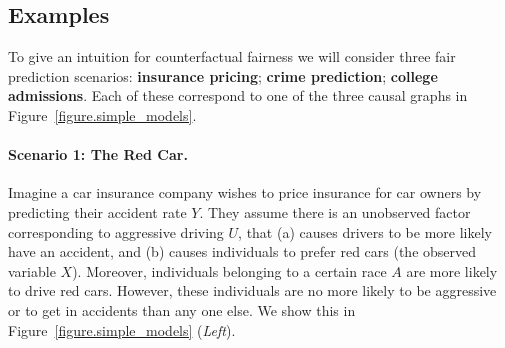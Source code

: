 

\subsection{Examples}
To give an intuition for counterfactual fairness we will consider three %
fair prediction scenarios: \textbf{insurance pricing}; \textbf{crime prediction}; \textbf{college admissions}. Each of these correspond to one of the three causal graphs in Figure~\ref{figure.simple_models}.%
%
\paragraph{Scenario 1: The Red Car.}
Imagine a car insurance company wishes to price insurance for car owners by
predicting their accident rate $Y$. They assume there is an
unobserved factor corresponding to aggressive driving $U$, that (a) causes
drivers to be more likely have an accident, and (b) causes individuals to prefer red cars (the observed
variable $X$). Moreover, individuals belonging to a
certain race $A$ are more likely to drive red cars. However, these individuals are no more likely to be aggressive or to get in accidents than any one else. We show this in Figure~\ref{figure.simple_models} (\emph{Left}).

